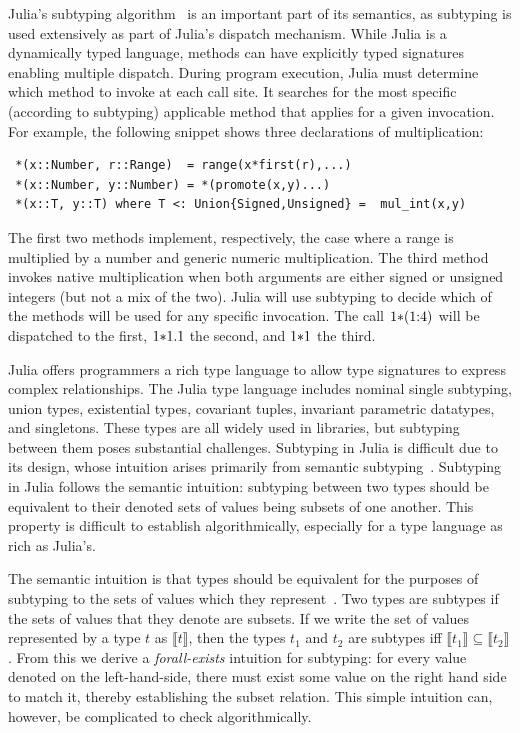 \documentclass[a4paper,english]{lipics-v2019}
\newcommand{\denotes}[1]{\llbracket #1 \rrbracket}
\renewcommand{\c}[1]{\ensuremath{\text{\lstinline{#1}}}\xspace}
\begin{document}
Julia's subtyping algorithm~\cite{bezansonthesis} is an important part of its
semantics, as subtyping is used extensively as part of Julia's dispatch
mechanism. While Julia is a dynamically typed language, methods can have
explicitly typed signatures enabling multiple dispatch. During program
execution, Julia must determine which method to invoke at each call site. It
searches for the most specific (according to subtyping) applicable method that
applies for a given invocation.  For example, the following snippet shows
three declarations of multiplication:

\begin{lstlisting}
 *(x::Number, r::Range)  = range(x*first(r),...)
 *(x::Number, y::Number) = *(promote(x,y)...)
 *(x::T, y::T) where T <: Union{Signed,Unsigned} =  mul_int(x,y)
\end{lstlisting}

\noindent The first two methods implement, respectively, the case where a
range is multiplied by a number and generic numeric multiplication. The
third method invokes native multiplication when both arguments are either
signed or unsigned integers (but not a mix of the two). Julia will use subtyping
to decide which of the methods will be used for any specific invocation. The call
\c{1*(1:4)} will be dispatched to the first, \c{1*1.1} the second, and \c{1*1} the third.

Julia offers programmers a rich type language to allow type signatures to
express complex relationships. The Julia type language includes nominal single
subtyping, union types, existential types, covariant tuples, invariant
parametric datatypes, and singletons. These types are all widely used in
libraries, but subtyping between them poses substantial challenges. Subtyping
in Julia is difficult due to its design, whose intuition arises primarily from
semantic subtyping~\cite{BezansonEKS17}. Subtyping in Julia follows the semantic intuition:
subtyping between two types should be equivalent to  their denoted
sets of values being subsets of one another. This property is difficult to
establish algorithmically, especially for a type language as rich as Julia's.

The semantic intuition is that types should be equivalent for the purposes of
subtyping to the sets of values which they represent~\cite{Pierce1991}. Two
types are subtypes if the sets of values that they denote are subsets. If we
write the set of values represented by a type $t$ as {\small $\denotes{t}$},
then the types $t_1$ and $t_2$ are subtypes iff {\small $\denotes{t_1}
\subseteq \denotes{t_2}$}. From this we derive a \emph{forall-exists}
intuition for subtyping: for every value denoted on the left-hand-side, there
must exist some value on the right hand side to match it, thereby establishing
the subset relation. This simple intuition can, however, be complicated to
check algorithmically.
\end{document}
